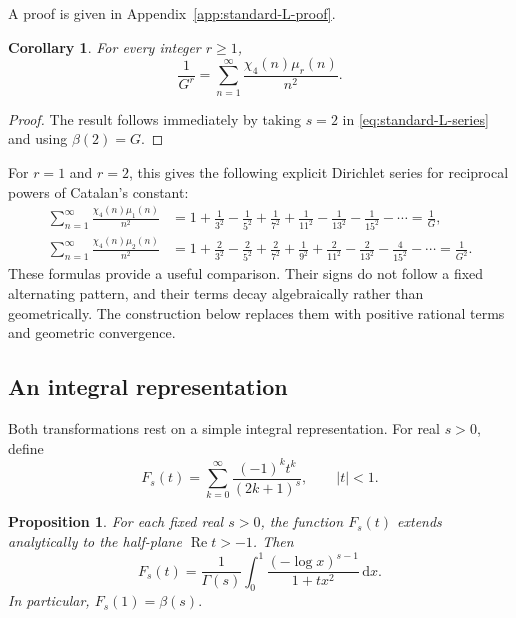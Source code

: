 \documentclass[11pt,reqno]{amsart}
\numberwithin{equation}{section}
\newtheorem{proposition}[theorem]{Proposition}
\newtheorem{corollary}[theorem]{Corollary}
\theoremstyle{definition}
\theoremstyle{remark}
\DeclareMathOperator{\RePart}{Re}
\newcommand{\dd}{\,\mathrm{d}}
\newcommand{\Gconst}{G}
\begin{document}
\medskip
\noindent A proof is given in Appendix~\ref{app:standard-L-proof}.


\begin{corollary}
For every integer \(r\geq1\),
\begin{equation}\label{eq:standard-G}
 \frac1{\Gconst^r}
 =\sum_{n=1}^{\infty}
   \frac{\chi_4(n)\mu_r(n)}{n^2}.
\end{equation}
\end{corollary}

\begin{proof}
The result follows immediately by taking \(s=2\) in
\eqref{eq:standard-L-series} and using
\(\beta(2)=\Gconst\).
\end{proof}

For \(r=1\) and \(r=2\), this gives the following explicit
Dirichlet series for reciprocal powers of Catalan's constant:
\begin{align}
 \sum_{n=1}^{\infty}
   \frac{\chi_4(n)\mu_1(n)}{n^2}
 &=1+\frac1{3^2}-\frac1{5^2}+\frac1{7^2}
   +\frac1{11^2}-\frac1{13^2}-\frac1{15^2}-\cdots
   =\frac1{\Gconst},
 \label{eq:standard-G1}\\
 \sum_{n=1}^{\infty}
   \frac{\chi_4(n)\mu_2(n)}{n^2}
 &=1+\frac2{3^2}-\frac2{5^2}+\frac2{7^2}
   +\frac1{9^2}+\frac2{11^2}-\frac2{13^2}
   -\frac4{15^2}-\cdots
   =\frac1{\Gconst^2}.
 \label{eq:standard-G2}
\end{align}
These formulas provide a useful comparison.  Their signs do not follow a
fixed alternating pattern, and their terms decay algebraically rather
than geometrically.  The construction below replaces them with
positive rational terms and geometric convergence.

\subsection{An integral representation}

Both transformations rest on a simple integral representation.  For
real \(s>0\), define
\begin{equation}\label{eq:F-definition}
 F_s(t)=\sum_{k=0}^{\infty}\frac{(-1)^kt^k}{(2k+1)^s},
 \qquad |t|<1.
\end{equation}

\begin{proposition}\label{prop:F-integral}
For each fixed real \(s>0\), the function \(F_s(t)\) extends
analytically to the half-plane
\(\RePart t>-1\). Then
\begin{equation}\label{eq:F-integral}
 F_s(t)
 =
 \frac1{\Gamma(s)}
 \int_0^1
 \frac{(-\log x)^{s-1}}{1+tx^2}\dd x.
\end{equation}
In particular,
\(
 F_s(1)=\beta(s).
\)
\end{proposition}
\end{document}

